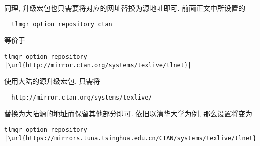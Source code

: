同理,
升级宏包也只需要将对应的网址替换为源地址即可.
前面正文中所设置的
\begin{lstlisting}
  tlmgr option repository ctan
\end{lstlisting}
等价于
\begin{lstlisting}[escapechar = |]
  tlmgr option repository |\url{http://mirror.ctan.org/systems/texlive/tlnet}|
\end{lstlisting}
使用大陆的源升级宏包,
只需将
\begin{lstlisting}
  http://mirror.ctan.org/systems/texlive/
\end{lstlisting}
替换为大陆源的地址而保留其他部分即可.
依旧以清华大学为例,
那么设置将变为
\begin{lstlisting}[escapechar = |]
  tlmgr option repository |\url{https://mirrors.tuna.tsinghua.edu.cn/CTAN/systems/texlive/tlnet}|
\end{lstlisting}
